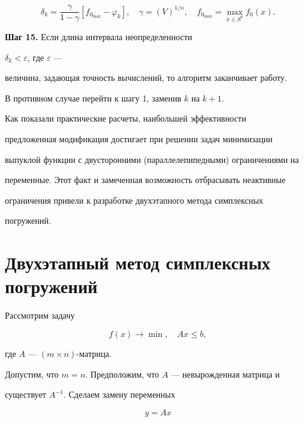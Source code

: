 $$


\delta_k=\frac{\gamma}{1-\gamma}[f_{0_{\max}}-\varphi_k],\quad


\gamma=(V)^{1/n},\quad f_{0_{\max}}=\max_{x\in S^0}f_0(x).


$$





{\bf Шаг 15.} Если длина интервала неопределенности


$\delta_k<\varepsilon$, где $\varepsilon$ ---


величина, задающая точность вычислений, то алгоритм заканчивает работу.


В противном случае перейти к шагу 1, заменив $k$ на $k+1$.





Как показали практические расчеты, наибольшей эффективности


предложенная модификация достигает при решении задач минимизации


выпуклой функции с двусторонними (параллелепипедными) ограничениями на


переменные. Этот факт и замеченная возможность отбрасывать неактивные


ограничения привели к разработке двухэтапного метода симплексных


погружений.





\section{Двухэтапный метод симплексных погружений}





Рассмотрим задачу


\begin{equation}


f(x)\to \min,\quad Ax\le b,


\end{equation}


где $A$ --- $(m\times n)$-матрица.


Допустим, что $m=n$. Предположим, что $A$ --- невырожденная матрица и


существует $A^{-1}$. Сделаем замену переменных


\begin{equation}


y=Ax


\end{equation}


